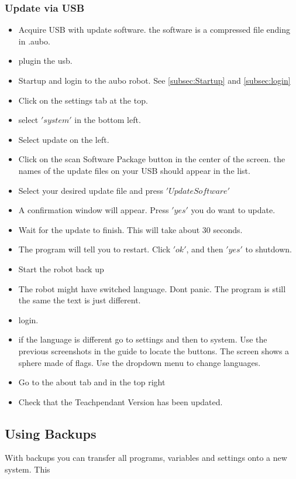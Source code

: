 \documentclass{article}
\begin{document}
\subsubsection{Update via USB}
\begin{itemize}
\item Acquire USB with update software. the software is a compressed file ending in .aubo. 
\item plugin the usb. 
\item Startup and login to the aubo robot. See \ref{subsec:Startup} and \ref{subsec:login} 
\item Click on the settings tab at the top. 
\item select $'system'$ in the bottom left. 
\item Select update on the left. 
\item Click on the scan Software Package button in the center of the screen. the names of the update files on your USB should appear in the list.
\item Select your desired update file and press $'Update Software'$
\item A confirmation window will appear. Press $'yes'$ you do want to update.
\item Wait for the update to finish. This will take about 30 seconds. 
\item The program will tell you to restart. Click $'ok'$, and then $'yes'$ to shutdown.
\item Start the robot back up
\item The robot might have switched language. Dont panic. The program is still the same the text is just different. 
\item login. 
\item if the language is different go to settings and then to system. Use the previous screenshots in the guide to locate the buttons. The screen shows a sphere made of flags. Use the dropdown menu to change languages.
\item Go to the about tab and in the top right
\item Check that the Teachpendant Version has been updated. 
\end{itemize}

\subsection{Using Backups} 
With backups you can transfer all programs, variables and settings onto a new system. This 
\end{document}
